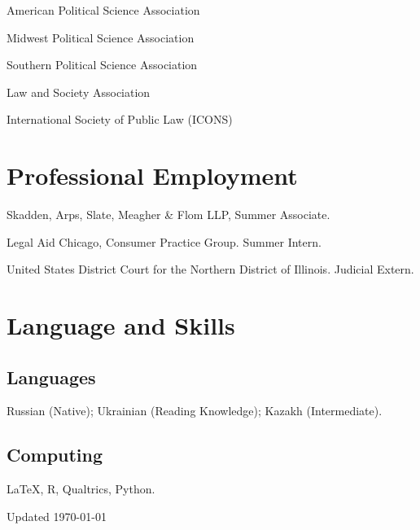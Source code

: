 \documentclass[11pt,letterpaper]{report}
\newcommand{\listitemspace}{0.25em}
\renewenvironment{itemize}
{\begin{list}{}{\setlength{\leftmargin}{0em}
                \setlength{\parskip}{0em}
                \setlength{\itemsep}{\listitemspace}
                \setlength{\parsep}{\listitemspace}}}
{\end{list}}
\begin{document}
    \begin{itemize}

        \item American Political Science Association
        \item Midwest Political Science Association
        \item Southern Political Science Association
        \item Law and Society Association
        \item International Society of Public Law (ICON\textperiodcentered{}S)

    \end{itemize}






 

    \section*{Professional Employment}

    \begin{tablist}
        \item[2025] \tab{}Skadden, Arps, Slate, Meagher \& Flom LLP, Summer Associate.
        \item[2024] \tab{}Legal Aid Chicago, Consumer Practice Group. Summer Intern.
        \item[2023] \tab{}United States District Court for the Northern District of Illinois. Judicial Extern.
 

    \end{tablist}


    \section*{Language and Skills}

    \subsection*{Languages}
        Russian (Native); Ukrainian (Reading Knowledge); Kazakh (Intermediate).
    \subsection*{Computing}
        \LaTeX, R, Qualtrics, Python.
    
    \begin{center}
        \vfill
        Updated \monthyeardate\today
    \end{center}
\end{document}
